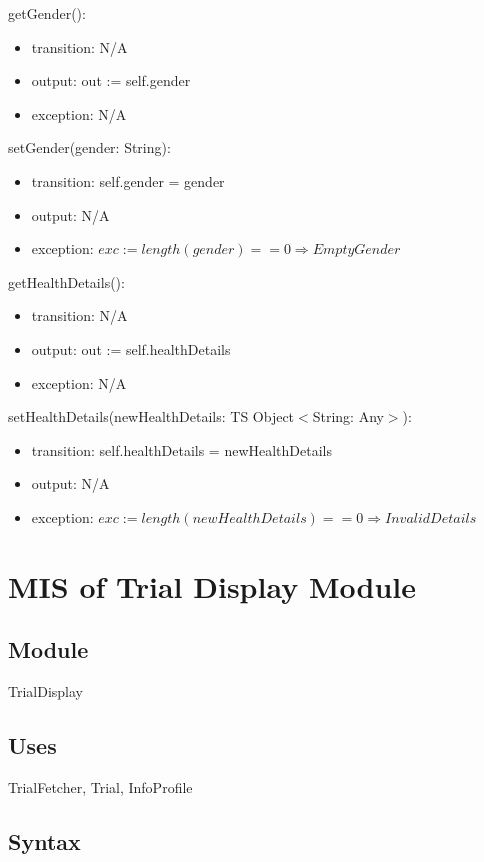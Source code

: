 \documentclass[12pt, titlepage]{article}
\begin{document}
\noindent getGender():
\begin{itemize}
\item transition: N/A
\item output: out := self.gender
\item exception: N/A
\end{itemize}

\noindent setGender(gender: String):
\begin{itemize}
\item transition: self.gender = gender
\item output: N/A
\item exception: $exc := length(gender) == 0 \Rightarrow EmptyGender$
\end{itemize}

\noindent getHealthDetails():
\begin{itemize}
\item transition: N/A
\item output: out := self.healthDetails
\item exception: N/A
\end{itemize}

\noindent setHealthDetails(newHealthDetails: TS Object$<$String: Any$>$):
\begin{itemize}
\item transition: self.healthDetails = newHealthDetails
\item output: N/A
\item exception: $exc := length(newHealthDetails) == 0 \Rightarrow InvalidDetails$
\end{itemize}


\section{MIS of Trial Display Module} \label{TrialDisplay}

\subsection{Module}

TrialDisplay

\subsection{Uses}
TrialFetcher, Trial, InfoProfile

\subsection{Syntax}
\end{document}

